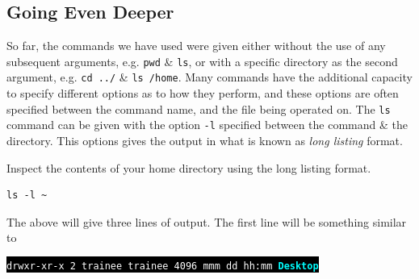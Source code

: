 \documentclass[a4paper,12pt,twoside]{memoir}
\begin{document}
\subsection{Going Even Deeper}
\begin{information}
So far, the commands we have used were given either without the use of any subsequent arguments, e.g. \texttt{pwd} \& \texttt{ls}, or with a specific directory as the second argument, e.g. \texttt{cd ../} \& \texttt{ls /home}.
Many commands have the additional capacity to specify different options as to how they perform, and these options are often specified between the command name, and the file being operated on.
The \texttt{ls} command can be given with the option \texttt{-l} specified between the command \& the directory.
This options gives the output in what is known as \textit{long listing} format. \\
\end{information}

\begin{steps}
Inspect the contents of your home directory using the long listing format. \\
\begin{lstlisting}
ls -l ~
\end{lstlisting}
\end{steps}

The above will give three lines of output.
The first line will be something similar to
\begin{center}
\colorbox{black}{\texttt{\textcolor{white}{drwxr-xr-x 2 trainee trainee 4096 mmm dd hh:mm} \textcolor{cyan}{\textbf{Desktop}}}}\\
\end{center}
\end{document}
